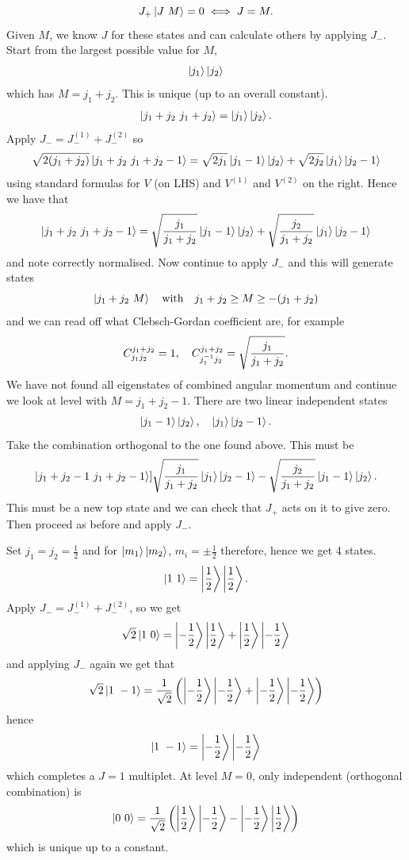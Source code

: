 \documentclass{article}
\begin{document}
\[
	J_+\ket{J\ M} = 0 \iff J = M.
\]
Given $ M $, we know $ J $ for these states and can calculate others by applying $ J_- $. Start from the largest possible value for $ M $,
\[
	\ket{j_1}\ket{j_2}
\]
which has $ M = j_1 + j_2 $. This is unique (up to an overall constant).
\begin{align*}
	\ket{j_1+j_2\ j_1+j_2} = \ket{j_1}\ket{j_2}.
\end{align*}
Apply $ J_- = J_-^{(1)} + J_-^{(2)} $ so
\[
	\sqrt{2(j_1+j_2)}\ket{j_1+j_2\ j_1+j_2 - 1} = \sqrt{2j_1}\ket{j_1 -1}\ket{j_2} + \sqrt{2j_2}\ket{j_1}\ket{j_2-1}
\]
using standard formulas for $ V $ (on LHS) and $ V^{(1)} $ and $ V^{(2)} $ on the right. Hence we have that
\[
	\ket{j_1+j_2\ j_1+j_2 - 1} = \sqrt{\frac{j_1}{j_1+j_2}} \ket{j_1 -1}\ket{j_2} + \sqrt{\frac{j_2}{j_1+j_2}} \ket{j_1}\ket{j_2 -1}
\]
and note correctly normalised. Now continue to apply $ J_- $ and this will generate states
\[
	\ket{j_1+ j_2 \ M} \quad \text{with}\quad j_1+j_2 \ge M \ge -(j_1+j_2)
\]
and we can read off what Clebsch-Gordan coefficient are, for example
\[
	C^{j_1+j_2}_{j_1j_2} = 1, \quad C^{j_1+j_2}_{{j}^{-1}_1j_2} = \sqrt{\frac{j_1}{j_1+j_2}}.
\]
We have not found all eigenstates of combined angular momentum and continue we look at level with $ M = j_1+j_2 -1 $. There are two linear independent states
\[
	\ket{j_1 -1}\ket{j_2},\quad \ket{j_1}\ket{j_2 -1}.
\]
Take the combination orthogonal to the one found above. This must be
\[
	\ket{j_1+j_2-1 \ j_1+j_2 -1} ] \sqrt{\frac{j_1}{j_1+j_2}}\ket{j_1}\ket{j_2-1} - \sqrt{\frac{j_2}{j_1+j_2}}\ket{j_1-1}\ket{j_2}.
\]
This must be a new top state and we can check that $ J_+ $ acts on it to give zero. Then proceed as before and apply $ J_- $.
\begin{example}
	Set $ j_1=j_2=\frac 12 $ and for $ \ket{m_1}\ket{m_2} $, $ m_i = \pm \frac 12 $ therefore, hence we get 4 states.
	\[
		\ket{1\ 1} = \ket{\frac 12}\ket{\frac 12}.
	\]
	Apply $ J_- = J_-^{(1)} + J_-^{(2)} $, so we get
	\[
		\sqrt 2 \ket{1\ 0} = \ket{-\frac 12}\ket{\frac 12} +\ket{\frac 12}\ket{-\frac 12}
	\]
	and applying $ J_- $ again we get that
	\[
		\sqrt 2 \ket{1\ -1} = \frac 1{\sqrt 2}\left(\ket{-\frac 12}\ket{-\frac 12} + \ket{-\frac 12}\ket{-\frac 12}\right)
	\]
	hence
	\[
		\ket{1\ -1} = \ket{-\frac 12}\ket{-\frac 12}
	\]
	which completes a $ J =1 $ multiplet. At level $ M = 0 $, only independent (orthogonal combination) is 
	\[
		\ket{0\ 0} = \frac 1{\sqrt 2}\left(\ket{\frac 12}\ket{-\frac 12} - \ket{-\frac 12}\ket{\frac 12}\right)
	\]
	which is unique up to a constant.
\end{example}
\end{document}
